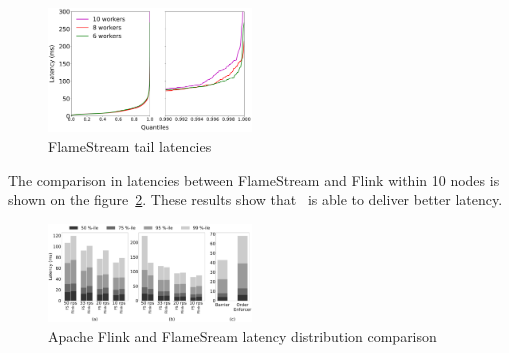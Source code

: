 \begin{figure}[htbp]
  \centering
  \includegraphics[width=0.48\textwidth]{pics/fs-index-quantiles}
  \caption{FlameStream tail latencies}
  \label {fs-index-quantiles}
\end{figure}

The comparison in latencies between FlameStream and Flink within 10 nodes is shown on the figure~\ref{comp-index-quantiles}. These results show that \FlameStream\ is able to deliver better latency.

\begin{figure}[htbp]
  \centering
  \includegraphics[width=0.48\textwidth]{pics/comp-index-quantiles}
  \caption{Apache Flink and FlameSream latency distribution comparison}
  \label {comp-index-quantiles}
\end{figure}
